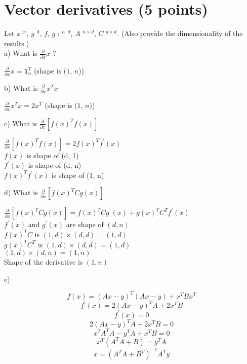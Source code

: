 \documentclass{article}
\newcommand{\R}{\mathbb{R}}
\begin{document}
\section{ Vector derivatives (5 points)}
Let $x$ \in \R$^{n}$, $y$ \in \R$^{d}$, $f$, $g$ : \R$^{n}$ \rightarrow \R$^{d}$, $A$ \in \R$^{n \times d}$, $C$ \in \R$^{d \times d}$. (Also provide the dimensionality of the results.) \\
a) What is $\frac{\partial}{\partial x}x$ ?
\begin{center}
    $\frac{\partial}{\partial x}x = \textbf{1}_{n}^{T}$ (shape is ($1$, $n$))
\end{center}
b) What is $\frac{\partial}{\partial x}x^Tx $
\begin{center}
    $\frac{\partial}{\partial x}x^Tx = 2x^{T}$ (shape is ($1$, $n$))
\end{center}
c) What is $\frac{\partial}{\partial x}[f(x)^Tf(x)]$
\begin{center}
    $\frac{\partial}{\partial x}[f(x)^{T}f(x)] = 2f(x)^{T}f^{'}(x)$\\
    $f(x)$ is shape of (d, 1) \\
    $f^{'}(x)$ is shape of (d, n) \\
    $f(x)^{T}f^{'}(x)$ is shape of (1, n)
    
\end{center}
d) What is $\frac{\partial}{\partial x}[f(x)^TCg(x)]$
\begin{center}
    $\frac{\partial}{\partial x}[f(x)^TCg(x)] = f(x)^{T}Cg^{'}(x) + g(x)^{T}C^{T}f^{'}(x)$ \\
    $f^{'}(x)$ and $g^{'}(x)$ are shape of $(d, n)$ \\
    $f(x)^{T}C$ is $(1, d) \times (d, d) = (1, d)$ \\
    $g(x)^{T}C^{T}$ is $(1, d) \times (d, d) = (1,d)$ \\
    $(1,d) \times (d, n) = (1, n)$ \\
    Shape of the derivative is $(1, n)$
\end{center}
e)
\begin{center}
    $$
        f(x) = (Ax-y)^{T}(Ax-y)+x^{T}Bx^{T}
    $$
    $$
        f^{'}(x) = 2(Ax-y)^{T}A + 2x^{T}B
    $$
    $$
        f^{'}(x) = 0
    $$
    $$
        2(Ax-y)^{T}A + 2x^{T}B = 0
    $$
    $$
        x^{T}A^{T}A-y^TA + x^{T}B = 0
    $$
    $$
        x^{T}(A^{T}A+B) = y^{T}A
    $$
    $$
        x = (A^TA+B^T)^{-1}A^{T}y
    $$
   
\end{center}
\end{document}
